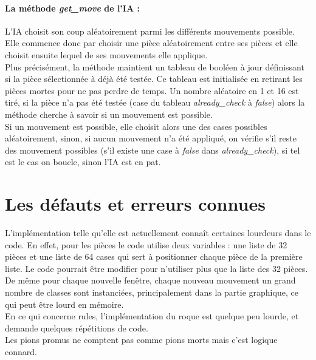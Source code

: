 \documentclass[a4paper]{article}
\begin{document}
\paragraph{La méthode \textit{get\_move} de l'IA :}L'IA choisit son coup aléatoirement parmi les différents mouvements possible. Elle commence donc par choisir une pièce aléatoirement entre ses pièces et elle choisit ensuite lequel de ses mouvements elle applique. \\ 

Plus précisément, la méthode maintient un tableau de booléen à jour définissant si la pièce sélectionnée à déjà été testée. Ce tableau est initialisée en retirant les pièces mortes pour ne pas perdre de temps. Un nombre aléatoire en 1 et 16 est tiré, si la pièce n'a pas été testée (case du tableau \textit{already\_check} à \textit{false}) alors la méthode cherche à savoir si un mouvement est possible. \\

Si un mouvement est possible, elle choisit alors une des cases possibles aléatoirement, sinon, si aucun mouvement n'a été appliqué, on vérifie s'il reste des mouvement possibles (s'il existe une case à \textit{false} dans \textit{already\_check}), si tel est le cas on boucle, sinon l'IA est en pat. 

\section{Les défauts et erreurs connues}

L'implémentation telle qu'elle est actuellement connaît certaines lourdeurs dans le code. En effet, pour les pièces le code utilise deux variables : une liste de 32 pièces et une liste de 64 cases qui sert à positionner chaque pièce de la première liste. Le code pourrait être modifier pour n'utiliser plus que la liste des 32 pièces. \\

De même pour chaque nouvelle fenêtre, chaque nouveau mouvement un grand nombre de classes sont instanciées, principalement dans la partie graphique, ce qui peut être lourd en mémoire. \\ 

En ce qui concerne rules, l'implémentation du roque est quelque peu lourde, et demande quelques répétitions de code. \\

Les pions promus ne comptent pas comme pions morts mais c'est logique connard.
\end{document}
